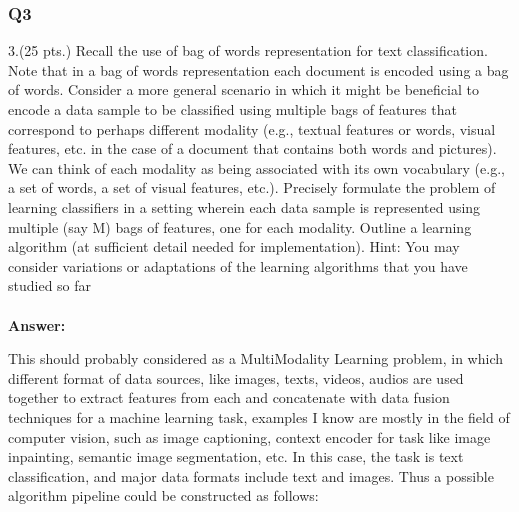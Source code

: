 \documentclass[11pt]{article}
\begin{document}
    \subsubsection*{Q3}\label{q3}

    3.(25 pts.) Recall the use of bag of words representation for text
classification. Note that in a bag of words representation each document
is encoded using a bag of words. Consider a more general scenario in
which it might be beneficial to encode a data sample to be classified
using multiple bags of features that correspond to perhaps different
modality (e.g., textual features or words, visual features, etc. in the
case of a document that contains both words and pictures). We can think
of each modality as being associated with its own vocabulary (e.g., a
set of words, a set of visual features, etc.). Precisely formulate the
problem of learning classifiers in a setting wherein each data sample is
represented using multiple (say M) bags of features, one for each
modality. Outline a learning algorithm (at sufficient detail needed for
implementation). Hint: You may consider variations or adaptations of the
learning algorithms that you have studied so far\\\\


\textbf{Answer:}


    This should probably considered as a MultiModality Learning
problem, in which different format of data sources, like images, texts,
videos, audios are used together to extract features from each and
concatenate with data fusion techniques for a machine learning task,
examples I know are mostly in the field of computer vision, such as
image captioning, context encoder for task like image inpainting,
semantic image segmentation, etc. In this case, the task is text
classification, and major data formats include text and images. Thus a
possible algorithm pipeline could be constructed as follows:
\end{document}

